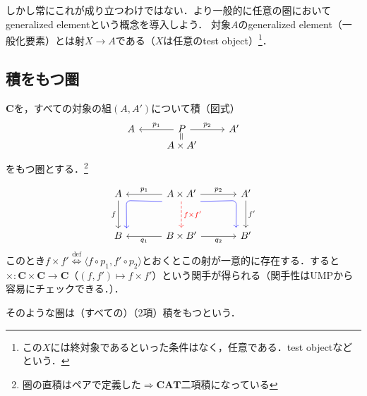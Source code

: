 \documentclass[dvipdfmx,a4j,10pt]{jsarticle}
\theoremstyle{mystyle1}
\theoremstyle{mystyle2}
\newcommand{\defLeftrightarrow}{\overset{\text{def}}{\iff}}
\def\startpoint#1{
    {\hfill\rlap{{$\overline{\tt{#1}\ \downarrow\ }$}}}\vspace{-1.5\baselineskip}
}
\begin{document}
しかし常にこれが成り立つわけではない．より一般的に任意の圏においてgeneralized elementという概念を導入しよう．
対象$A$のgeneralized element（一般化要素）とは射$X\to A$である（$X$は任意のtest object）\footnote{この$X$には終対象であるといった条件はなく，任意である．test objectなどという．}．


\startpoint{6/14(第9回)}

\subsection{積をもつ圏}

$\mathbf{C}$を，すべての対象の組$(A,A')$について積（図式）
\begin{equation}
	\begin{tikzcd}[row sep=0.4ex]
		A & P \arrow[l,"p_1"'] \arrow[r,"p_2"] \arrow[d,phantom,"\rotatebox{90}{$=$}"]& A' \\
		& A\times A' &
	\end{tikzcd}
\end{equation}
をもつ圏とする．\footnote{圏の直積はペアで定義した$\Rightarrow\mathbf{CAT}$二項積になっている}

\begin{equation}
	\begin{tikzcd}[row sep=large,column sep=large]
		|[alias=A]| A \arrow[d,"f"'] & A\times A' \arrow[l,"p_1"'] \arrow[r,"p_2"]
		\arrow[ld,blue,rounded corners,to path={(\tikztostart.south west)--(A.south east)--(\tikztotarget.north east)}]
		\arrow[rd,blue,rounded corners,to path={(\tikztostart.south east)--(Ad.south west)--(\tikztotarget.north west)}]
		\arrow[d,red,dashed,"f\times f'"] & |[alias=Ad]| A' \arrow[d,"f'"] \\
		B & B\times B' \arrow[l,"q_1"] \arrow[r,"q_2"'] & B'
	\end{tikzcd}
\end{equation}
このとき$f\times f'\defLeftrightarrow \langle f\circ p_1,f'\circ p_2\rangle$とおくとこの射が一意的に存在する．すると$\times:\mathbf{C}\times\mathbf{C}\to \mathbf{C}$（$(f,f')\mapsto f\times f'$）という関手が得られる（関手性はUMPから容易にチェックできる．）．

そのような圏は（すべての）（2項）積をもつという．
\end{document}
